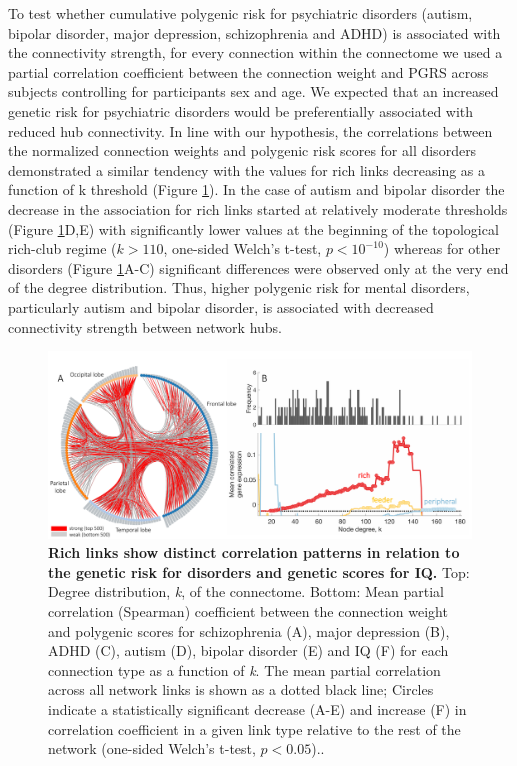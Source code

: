 To test whether cumulative polygenic risk for psychiatric disorders (autism, bipolar disorder, major depression, schizophrenia and ADHD) is associated with the connectivity strength, for every connection within the connectome we used a partial correlation coefficient between the connection weight and PGRS across subjects controlling for participants sex and age. We expected that an increased genetic risk for psychiatric disorders would be preferentially associated with reduced hub connectivity. In line with our hypothesis, the correlations between the normalized connection weights and polygenic risk scores for all disorders demonstrated a similar tendency with the values for rich links decreasing as a function of k threshold (Figure \ref{fig:Ch5Fig5}). In the case of autism and bipolar disorder the decrease in the association for rich links started at relatively moderate thresholds (Figure \ref{fig:Ch5Fig5}D,E) with significantly lower values at the beginning of the topological rich-club regime ($k>110$, one-sided Welch's t-test, $p < 10^{-10}$) whereas for other disorders (Figure \ref{fig:Ch5Fig5}A-C) significant differences were observed only at the very end of the degree distribution. Thus, higher polygenic risk for mental disorders, particularly autism and bipolar disorder, is associated with decreased connectivity strength between network hubs.

\begin{figure}[h!]
\begin{center}
\includegraphics[width=1\textwidth]{Chapter5/Ch5Fig5.pdf}%
\end{center}
\caption{\textbf{Rich links show distinct correlation patterns in relation to the genetic risk for disorders and genetic scores for IQ.}
Top: Degree distribution, \textit{k}, of the connectome. Bottom: Mean partial correlation (Spearman) coefficient between the connection weight and polygenic scores for schizophrenia (A), major depression (B), ADHD (C), autism (D), bipolar disorder (E) and IQ (F) for each connection type as a function of \textit{k}. The mean partial correlation across all network links is shown as a dotted black line; Circles indicate a statistically significant decrease (A-E) and increase (F) in correlation coefficient in a given link type relative to the rest of the network (one-sided Welch's t-test, $p < 0.05$)..}
\label{fig:Ch5Fig5}
\end{figure}

